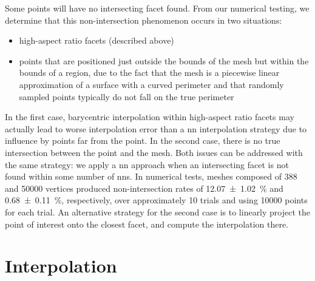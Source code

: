 \documentclass[final,12pt]{elsarticle}
\begin{document}
Some \outpt{} points will have no intersecting facet found.
From our numerical testing, we determine that this non-intersection phenomenon occurs in two situations:
\begin{itemize}%
	\item high-aspect ratio facets (described above)
	\item \outpt{} points that are positioned just outside the bounds of the mesh but within the bounds of a region, due to the fact that the mesh is a piecewise linear approximation of a surface with a curved perimeter and that randomly sampled points typically do not fall on the true perimeter
\end{itemize}
In the first case, barycentric interpolation within high-aspect ratio facets may actually lead to worse interpolation error than a \gls{nn} interpolation strategy due to influence by points far from the \outpt{} point. In the second case, there is no true intersection between the \outpt{} point and the mesh. Both issues can be addressed with the same strategy: we apply a \gls{nn} approach when an intersecting facet is not found within some number of \glspl{nn}. In numerical tests, meshes composed of \num{388} and \num{50000} vertices produced non-intersection rates of \SI{12.07 \pm 1.02}{\percent} and \SI{0.68 \pm 0.11}{\percent}, respectively, over approximately \num{10} trials and using \num{10000} \outpt{} points for each trial. An alternative strategy for the second case is to linearly project the point of interest onto the closest facet, and compute the interpolation there.
%
%
\section{Interpolation}
\label{sec:app:bary-interp}
\end{document}
